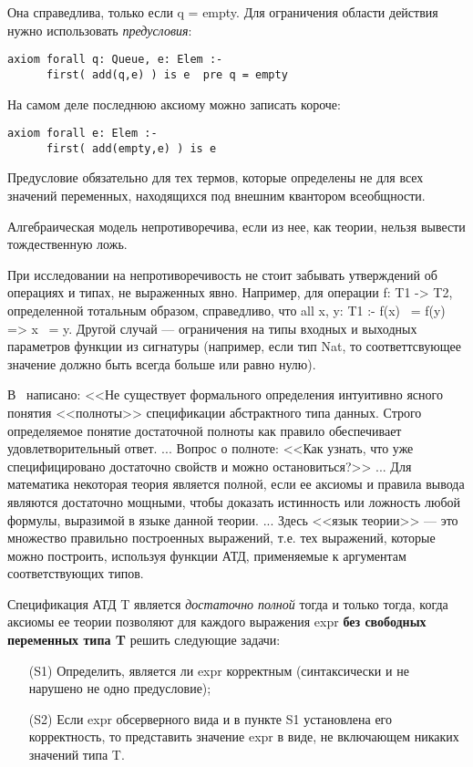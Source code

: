 Она справедлива, только если q = empty. Для ограничения области действия нужно использовать \emph{предусловия}:
\begin{lstlisting}
axiom forall q: Queue, e: Elem :-
      first( add(q,e) ) is e  pre q = empty
\end{lstlisting}

На самом деле последнюю аксиому можно записать короче:
\begin{lstlisting}
axiom forall e: Elem :-
      first( add(empty,e) ) is e
\end{lstlisting}

Предусловие обязательно для тех термов, которые определены не для всех значений переменных, находящихся под внешним квантором всеобщности.


Алгебраическая модель непротиворечива, если из нее, как теории, нельзя вывести тождественную ложь.

При исследовании на непротиворечивость не стоит забывать утверждений об операциях и типах, не выраженных явно. Например, для операции f: T1 -> T2, определенной тотальным образом, справедливо, что all x, y: T1 :- f(x) ~= f(y) => x ~= y. Другой случай --- ограничения на типы входных и выходных параметров функции из сигнатуры (например, если тип Nat, то соответтсвующее значение должно быть всегда больше или равно нулю).


В~\cite{mayer} написано: <<Не существует формального определения интуитивно ясного понятия <<полноты>> спецификации абстрактного типа данных. Строго определяемое понятие достаточной полноты как правило обеспечивает удовлетворительный ответ. ... Вопрос о полноте: <<Как узнать, что уже специфицировано достаточно свойств и можно остановиться?>> ... Для математика некоторая теория является полной, если ее аксиомы и правила вывода являются достаточно мощными, чтобы доказать истинность или ложность любой формулы, выразимой в языке данной теории. ... Здесь <<язык теории>> --- это множество правильно построенных выражений, т.е. тех выражений, которые можно построить, используя функции АТД, применяемые к аргументам соответствующих типов.

Спецификация АТД T является \emph{достаточно полной} тогда и только тогда, когда аксиомы ее теории позволяют для каждого выражения expr \textbf{без свободных переменных типа T} решить следующие задачи:

\begin{itemize}
\item[(S1)] Определить, является ли expr корректным (синтаксически и не нарушено не одно предусловие);
\item[(S2)] Если expr обсерверного вида и в пункте S1 установлена его корректность, то представить значение expr в виде, не включающем никаких значений типа T.
\end{itemize}

